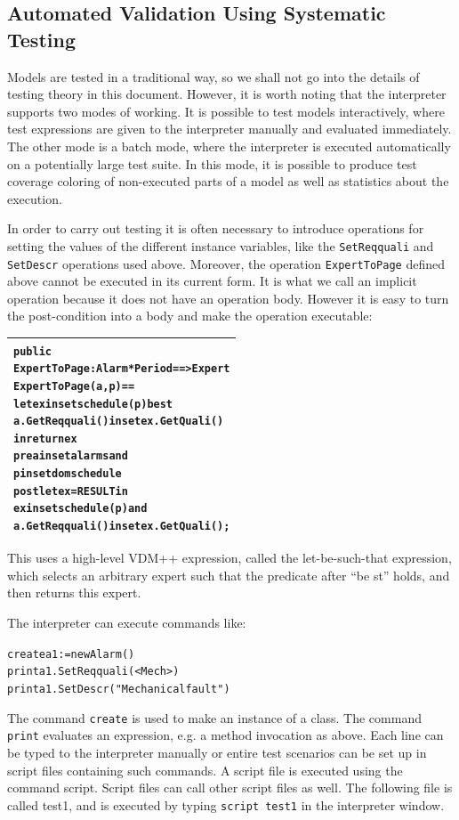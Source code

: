 \documentclass[\pformat,12pt,twoside]{article}
\newenvironment{VDMgray}%
{\begin{tabular}{|G|}\hline\small\begin{alltt}}%
{\end{alltt}\normalsize\\
 \hline\end{tabular}}
\begin{document}
\subsection{Automated Validation Using Systematic Testing }

Models are tested in a traditional way, so we shall not go into 
the details of testing theory in this document. However, it is 
worth noting that the interpreter supports two modes of working. 
It is possible to test models interactively, where test expressions 
are given to the interpreter manually and evaluated immediately. 
The other mode is a batch mode, where the interpreter is executed 
automatically on a potentially large test suite. In this mode, 
it is possible to produce test coverage coloring of non-executed 
parts of a model as well as statistics about the execution.

In order to carry out testing it is often necessary to introduce 
operations for setting the values of the different instance variables, 
like the \texttt{SetReqquali} and \texttt{SetDescr} operations used above. Moreover, 
the operation \texttt{ExpertToPage} defined above cannot be executed in 
its current form. It is what we call an implicit operation because 
it does not have an operation body. However it is easy to turn 
the post-condition into a body and make the operation executable:

\begin{VDMgray}
  public
  ExpertToPage : Alarm * Period ==\texttt{>} Expert
  ExpertToPage(a, p) ==
    let ex in set schedule(p) be st
        a.GetReqquali() in set ex.GetQuali()
    in return ex
  pre a in set alarms and
      p in set dom schedule
  post let ex = RESULT in
         ex in set schedule(p) and
         a.GetReqquali() in set ex.GetQuali();
\end{VDMgray}


This uses a high-level VDM++ expression, called the let-be-such-that 
expression, which selects an arbitrary expert such that the predicate 
after ``be st'' holds, and then returns this expert.

The interpreter can execute commands like:

\small
\begin{alltt}
  create a1 := new Alarm()
  print a1.SetReqquali(\texttt{<}Mech\texttt{>})
  print a1.SetDescr("Mechanical fault")
\end{alltt}
\normalsize

The command \texttt{create} is used to make an instance of a class. The 
command \texttt{print} evaluates an expression, e.g. a method invocation 
as above. Each line can be typed to the interpreter manually 
or entire test scenarios can be set up in script files containing 
such commands. A script file is executed using the command script. 
Script files can call other script files as well. The following 
file is called test1, and is executed by typing \texttt{script test1}
in the interpreter window.
\end{document}
